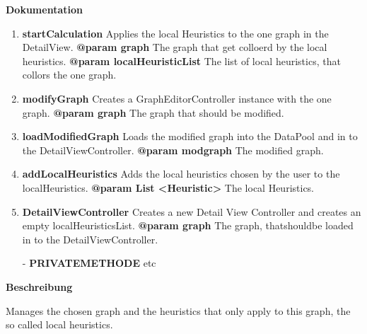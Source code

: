 \textbf{Dokumentation}
\begin{enumerate}[+]
	\item{
	\textbf{startCalculation} \newline
	Applies the local Heuristics to the one graph in the DetailView. \newline
	\textbf{@param graph} The graph that get colloerd by the local heuristics. \newline
	\textbf{@param localHeuristicList} The list of local heuristics, that collors the one graph.
}

	\item{
	\textbf{modifyGraph} \newline
	Creates a GraphEditorController instance with the one graph. \newline
	\textbf{@param graph} The graph that should be modified. \newline
}
	\item{
	\textbf{loadModifiedGraph} \newline
	Loads the modified graph into the DataPool and in to the DetailViewController. \newline
	\textbf{@param modgraph} The modified graph. \newline
}
	\item{
	\textbf{addLocalHeuristics} \newline
	Adds the local heuristics chosen by the user to the localHeuristics. \newline
	\textbf{@param List <Heuristic>} The local Heuristics. \newline
}
	\item{
	\textbf{DetailViewController} \newline
	Creates a new Detail View Controller and creates an empty localHeuristicsList. \newline
	\textbf{@param graph} The graph, thatshouldbe loaded in to the DetailViewController. \newline
}
	\item[-]{
		\textbf{PRIVATEMETHODE} etc
	}
\end{enumerate}

\textbf{Beschreibung}

Manages the chosen graph and the heuristics that only apply to this graph, the so called local heuristics. \newline

